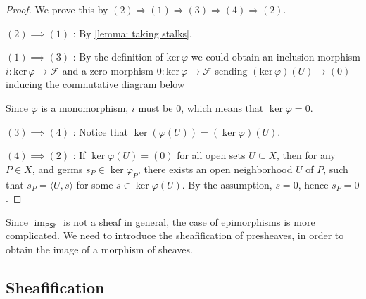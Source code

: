 \documentclass[11pt]{article}
\newcommand{\im}{\operatorname{im}}
\begin{document}
\begin{proof}
    We prove this by $(2) \Longrightarrow (1) \Longrightarrow (3) \Longrightarrow (4) \Longrightarrow (2)$. 

    $ (2) \implies (1) $ : By \ref{lemma: taking stalks}. 

    $ (1) \implies (3)$ : By the definition of $\mathrm{ker}\,\varphi$ 
    we could obtain an inclusion morphism 
    $i : \mathrm{ker}\,\varphi \to \mathscr{F}$ 
    and a zero morphism $0:\mathrm{ker}\,\varphi \to \mathscr{F}$ 
    sending $(\mathrm{ker}\,\varphi)(U) \mapsto (0)$ 
    inducing the commutative diagram below 
    \begin{center}
    \end{center}
    Since $ \varphi $ is a monomorphism, $ i $ must be $ 0 $, 
    which means that $ \ker \varphi = 0 $. 

    $ (3) \implies (4) $ : 
    Notice that $ \ker (\varphi(U))= (\ker \varphi)(U) $. 

    $ (4) \implies (2) $ :
    If $ \ker \varphi(U) = (0) $ for all open sets $ U \subseteq X $, 
    then for any $ P \in X $, and germs $ s_{P} \in \ker \varphi_{P} $, 
    there exists an open neighborhood $ U $ of $ P $, 
    such that $ s_{P} = \langle U, s \rangle $ for some $ s \in \ker \varphi(U) $. 
    By the assumption, $ s = 0 $, hence $ s_{P} = 0 $. 

\end{proof}

Since $ \im_{\mathsf{PSh}} $ is not a sheaf in general, 
the case of epimorphisms is more complicated. 
We need to introduce the sheafification of presheaves, 
in order to obtain the image of a morphism of sheaves. 

\subsection{Sheafification}
\end{document}
